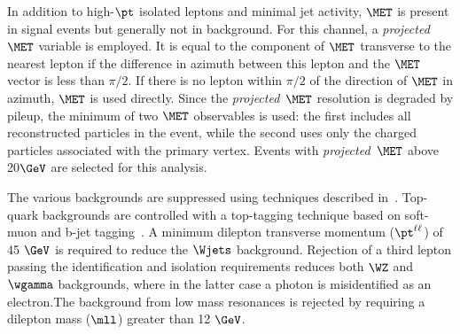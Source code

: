 

In addition to high-$\pt$ isolated leptons and minimal jet
activity, $\MET$ is present in signal events but
generally not in background. For this channel, a
\textit{projected}~$\MET$ variable is employed. It is equal to the
component of $\MET$ transverse to the nearest lepton if the difference
in azimuth between this lepton and the $\MET$ vector is less than
$\pi/2$. If there is no lepton within $\pi/2$ of the direction of
$\MET$ in azimuth, $\MET$ is used directly.  Since the
\textit{projected}~$\MET$ resolution is degraded by pileup, the
minimum of two $\MET$ observables is used: the first includes all
reconstructed particles in the event, while the second uses only the
charged particles associated with the primary vertex.  Events with
\textit{projected}~$\MET$ above 20$\GeV$ are selected for this
analysis.

The various backgrounds are suppressed using techniques described
in~\cite{cmsobsboson}. Top-quark backgrounds are controlled with a
top-tagging technique based on soft-muon and b-jet
tagging~\cite{CMS-PAS-BTV-11-003}. A minimum dilepton transverse momentum
($\pt^{\ell\ell}$) of 45 $\GeV$ is required to reduce the $\Wjets$
background. Rejection of a third lepton passing the identification and
isolation requirements reduces both $\WZ$ and $\wgamma$ backgrounds,
where in the latter case a photon is misidentified as an electron.The
background from low mass resonances is rejected by requiring a
dilepton mass ($\mll$) greater than 12 $\GeV$.

